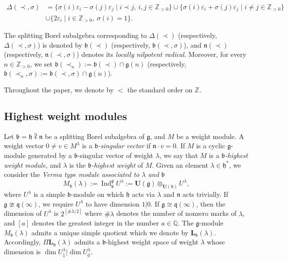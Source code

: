 \documentclass[12pt]{amsart}
\newcommand\Z{\mathbb{Z}}
\newcommand\Q{\mathbb{Q}}
\newcommand\g{\mathfrak{g}}
\newcommand\fq{\mathfrak{q}}
\newcommand\fh{\mathfrak{h}}
\newcommand\fn{\mathfrak{n}}
\newcommand\fb{\mathfrak{b}}
\newcommand\D{\Delta}
\newcommand\bU{\mathbf{U}}
\newcommand\bL{\mathbf{L}}
\DeclareMathOperator{\Ind}{Ind}
\theoremstyle{plain}
\theoremstyle{definition}
\numberwithin{equation}{section}
\begin{document}
\begin{align*}
\D(\prec, \sigma) & = \{\sigma(i)\varepsilon_i - \sigma(j)\varepsilon_j\mid i\prec j,\ i,j\in \Z_{>0}\}\cup \{\sigma(i)\varepsilon_i + \sigma(j)\varepsilon_j\mid i\neq j\in \Z_{>0}\}  \\
& \cup \{2\varepsilon_i \mid i\in \Z_{>0},\ \sigma(i)=1\}.
\end{align*}

The splitting Borel subalgebra corresponding to $\D(\prec)$ (respectively, $\D(\prec, \sigma)$) is denoted by $\fb(\prec)$ (respectively, $\fb(\prec, \sigma)$), and $\fn(\prec)$ (respectively, $\fn(\prec,\sigma)$) denotes its \emph{locally nilpotent radical}. Moreover, for every $n\in \Z_{>0}$, we set $\fb(\prec_n) :=\fb(\prec)\cap \g(n)$ (respectively, $\fb(\prec_n,\sigma) :=\fb(\prec,\sigma)\cap \g(n)$).

Throughout the paper, we denote by $<$ the standard order on $\Z$.

\subsection{Highest weight modules}
Let $\fb = \fh \supsetplus \fn$ be a splitting Borel subalgebra of $\g$, and $M$ be a weight module. A weight vector $0\neq v\in M^\lambda$ is a \emph{$\fb$-singular vector} if $\fn\cdot v = 0$. If $M$ is a cyclic $\g$-module generated by a $\fb$-singular vector of weight $\lambda$, we say that $M$ is a \emph{$\fb$-highest weight module}, and $\lambda$ is the \emph{$\fb$-highest weight} of $M$. Given an element $\lambda\in \fh^*$, we consider the \emph{Verma type module associated to $\lambda$ and $\fb$}
	\[
M_\fb (\lambda):=\Ind_\fb^\g U^\lambda := \bU(\g)\otimes_{\bU(\fb)} U^\lambda,
	\]
where $U^\lambda$ is a simple $\fb$-module on which $\fh$ acts via $\lambda$ and $\fn$ acts trivially. If $\g\ncong \fq(\infty)$, we require $U^\lambda$ to have dimension $1|0$. If $\g\cong \fq(\infty)$, then the dimension of $U^\lambda$ is $2^{[\# \lambda/2]}$ where $\# \lambda$ denotes the number of nonzero marks of $\lambda$, and $[a]$ denotes the greatest integer in the number $a\in \Q$. The $\g$-module $M_\fb(\lambda)$ admits a unique simple quotient which we denote by $\bL_{\fb}(\lambda)$. Accordingly, $\Pi \bL_{\fb}(\lambda)$ admits a $\fb$-highest weight space of weight $\lambda$ whose dimension is $\dim U^\lambda_{\bar 1}|\dim U^\lambda_{\bar 0}$. 
\end{document}
